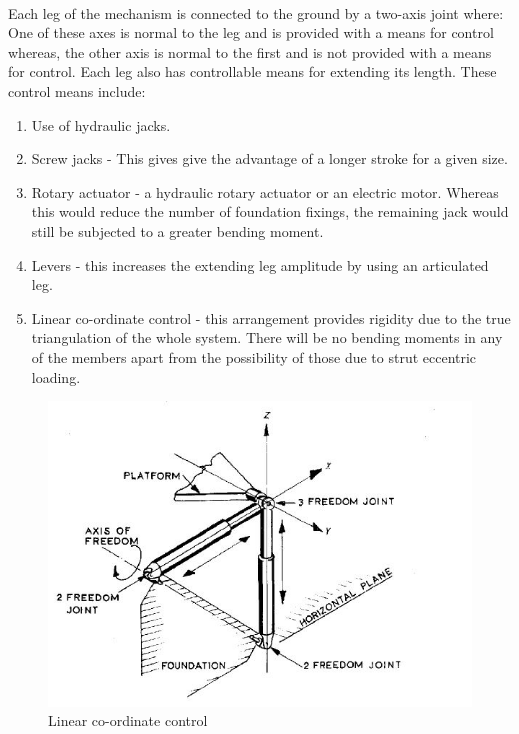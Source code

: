 \paragraph{}Each leg of the mechanism is connected to the ground by a two-axis joint where: One of these axes is normal to the leg and is provided with a means for control whereas, the other axis is normal to the first and is not provided with a means for control. Each leg also has controllable means for extending its length. These control means include:
\begin{enumerate}
\item Use of hydraulic jacks.
\item Screw jacks - This gives give the advantage of
a longer stroke for a given size.
\item Rotary actuator - a hydraulic rotary actuator or an electric motor. Whereas this would reduce the number of foundation fixings, the remaining jack would still be subjected to a greater bending moment.
\item Levers - this increases the extending leg amplitude by using an articulated leg.
\item Linear co-ordinate control - this arrangement provides rigidity due to the true triangulation of
the whole system. There will be no bending moments in any of the members apart from the possibility of those due to strut eccentric loading. 
\end{enumerate}
\begin{center}
	\begin{figure}[!h]
	\centering
	\includegraphics{Figures/Fig11}
	\caption{Linear co-ordinate control}
	\end{figure}
\end{center}
